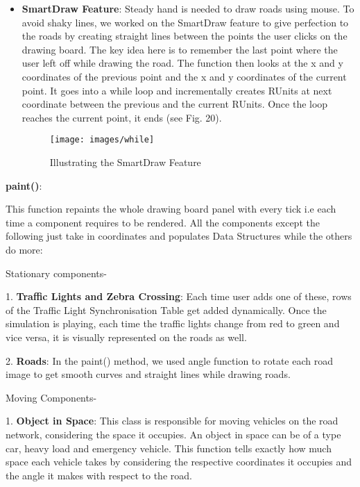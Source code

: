 \documentclass[11pt,a4paper]{article}
\begin{document}
\begin{itemize}
  	 \item \textbf{SmartDraw Feature}: Steady hand is needed to draw roads using mouse. To avoid shaky lines, we worked on the SmartDraw feature to give perfection to the roads by creating straight lines between the points the user clicks on the drawing board. The key idea here is to remember the last point where the user left
  		off while drawing the road. The function then looks at the x and y
  		coordinates of the previous point and the x and y coordinates of
  		the current point. It goes into a while loop and incrementally
  		creates RUnits at next coordinate between the previous and the
  		current RUnits. Once the loop reaches the current point, it ends (see Fig. 20).
  		
  		\begin{figure}[h!]
			\texttt{[image: images/while]}
			\caption{Illustrating the SmartDraw Feature}
			\centering
		\end{figure} 

  \end{itemize}
  
  \textbf{paint()}:

  		This function repaints the whole drawing board panel with every tick
  i.e each time a component requires to be rendered.
  All the components except the following just take in coordinates and
  populates Data Structures while the others do more:
  
  \setlength{\parindent}{0cm}\bigskip
  Stationary components- 
	
  1. \textbf{ Traffic Lights and Zebra Crossing}: Each time user adds one of these, rows of the Traffic Light Synchronisation Table get added dynamically. Once the simulation is playing, each time the traffic lights change from red to green and vice versa, it is visually represented on the roads as well.
    
  2. \textbf{ Roads}: In the paint() method, we used angle function to rotate each road image to get smooth curves and straight lines while drawing roads.
 
  \setlength{\parindent}{0cm}\bigskip
  Moving Components-
  
  1. \textbf{Object in Space}: This class is responsible for moving vehicles on the road network, considering the space it occupies. An object in space can be of a type car, heavy load and emergency vehicle. This function tells exactly how much space each vehicle takes by considering the respective coordinates it occupies and the angle it makes with respect to the road.
\end{document}
